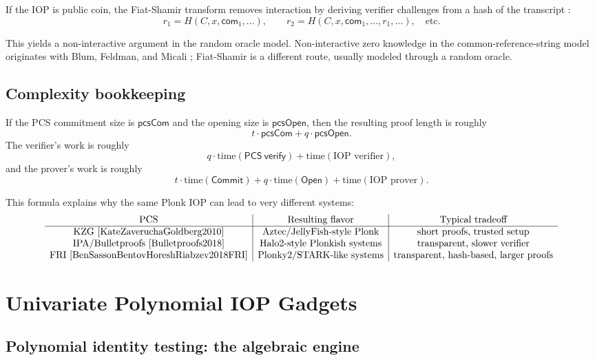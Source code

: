 \documentclass[11pt]{article}
\begin{document}
If the IOP is public coin, the Fiat-Shamir transform removes interaction by deriving verifier challenges from a hash of the transcript \cite{FiatShamir1986}:
\[
 r_1 = H(C,x,\mathsf{com}_1,\dots),\qquad
 r_2 = H(C,x,\mathsf{com}_1,\dots,r_1,\dots),\quad \text{etc.}
\]

This yields a non-interactive argument in the random oracle model. Non-interactive zero knowledge in the common-reference-string model originates with Blum, Feldman, and Micali \cite{BlumFeldmanMicali1988}; Fiat-Shamir is a different route, usually modeled through a random oracle.

\subsection{Complexity bookkeeping}

If the PCS commitment size is $\mathsf{pcsCom}$ and the opening size is $\mathsf{pcsOpen}$, then the resulting proof length is roughly
\[
 t\cdot \mathsf{pcsCom} + q\cdot \mathsf{pcsOpen}.
\]
The verifier's work is roughly
\[
 q\cdot \mathrm{time}(\mathsf{PCS\ verify}) + \mathrm{time}(\text{IOP verifier}),
\]
and the prover's work is roughly
\[
 t\cdot \mathrm{time}(\mathsf{Commit}) + q\cdot \mathrm{time}(\mathsf{Open}) + \mathrm{time}(\text{IOP prover}).
\]

This formula explains why the same Plonk IOP can lead to very different systems:
\[
\begin{array}{c|c|c}
\text{PCS} & \text{Resulting flavor} & \text{Typical tradeoff}\\
\hline
\text{KZG \cite{KateZaveruchaGoldberg2010}} & \text{Aztec/JellyFish-style Plonk} & \text{short proofs, trusted setup}\\
\text{IPA/Bulletproofs \cite{Bulletproofs2018}} & \text{Halo2-style Plonkish systems} & \text{transparent, slower verifier}\\
\text{FRI \cite{BenSassonBentovHoreshRiabzev2018FRI}} & \text{Plonky2/STARK-like systems} & \text{transparent, hash-based, larger proofs}\\
\end{array}
\]


\section{Univariate Polynomial IOP Gadgets}

\subsection{Polynomial identity testing: the algebraic engine}
\end{document}
